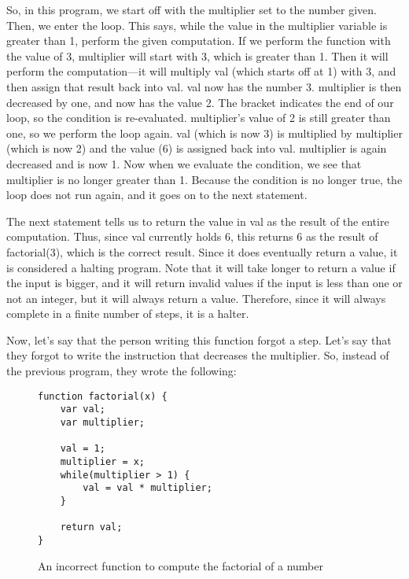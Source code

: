 So, in this program, we start off with the multiplier set to the number given.  Then, we enter the loop.  This says, while the value in the multiplier variable is greater than 1, perform the given computation.  If we perform the function with the value of 3, multiplier will start with 3, which is greater than 1.  Then it will perform the computation---it will multiply val (which starts off at 1) with 3, and then assign that result back into val.  val now has the number 3.  multiplier is then decreased by one, and now has the value 2.  The bracket indicates the end of our loop, so the condition is re-evaluated.  multiplier's value of 2 is still greater than one, so we perform the loop again.  val (which is now 3) is multiplied by multiplier (which is now 2) and the value (6) is assigned back into val.  multiplier is again decreased and is now 1.  Now when we evaluate the condition, we see that multiplier is no longer greater than 1.  Because the condition is no longer true, the loop does not run again, and it goes on to the next statement.  

The next statement tells us to return the value in val as the result of the entire computation.  Thus, since val currently holds 6, this returns 6 as the result of factorial(3), which is the correct result.  Since it does eventually return a value, it is considered a halting program.  Note that it will take longer to return a value if the input is bigger, and it will return invalid values if the input is less than one or not an integer, but it will always return a value.  Therefore, since it will always complete in a finite number of steps, it is a halter.

Now, let's say that the person writing this function forgot a step.  Let's say that they forgot to write the instruction that decreases the multiplier.  So, instead of the previous program, they wrote the following:

\begin{figure}[H]
\begin{mdframed}
\begin{verbatim}
function factorial(x) {
	var val;
	var multiplier;

	val = 1;
	multiplier = x;
	while(multiplier > 1) {
		val = val * multiplier;
	}

	return val;
}
\end{verbatim}
\end{mdframed}
\caption{An incorrect function to compute the factorial of a number}
\end{figure}


